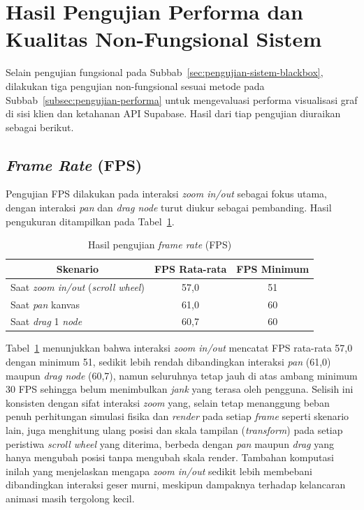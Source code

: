 \section{Hasil Pengujian Performa dan Kualitas Non-Fungsional Sistem}
\label{sec:hasil-pengujian-performa}
\begin{sloppypar}
Selain pengujian fungsional pada Subbab~\ref{sec:pengujian-sistem-blackbox}, dilakukan tiga pengujian non-fungsional sesuai metode pada Subbab~\ref{subsec:pengujian-performa} untuk mengevaluasi performa visualisasi graf di sisi klien dan ketahanan API Supabase. Hasil dari tiap pengujian diuraikan sebagai berikut.
\end{sloppypar}

\subsection{\textit{Frame Rate} (FPS)}
Pengujian FPS dilakukan pada interaksi \textit{zoom in/out} sebagai fokus utama, dengan interaksi \textit{pan} dan \textit{drag node} turut diukur sebagai pembanding. Hasil pengukuran ditampilkan pada Tabel~\ref{tab:fps}.

\begin{table}[H]
\centering
\caption{Hasil pengujian \textit{frame rate} (FPS)}
\label{tab:fps}
\renewcommand{\arraystretch}{1.3}
\begin{tabular}{|l|c|c|}
\hline
\multicolumn{1}{|c|}{\textbf{Skenario}} & \multicolumn{1}{c|}{\textbf{FPS Rata-rata}} & \multicolumn{1}{c|}{\textbf{FPS Minimum}} \\
\hline
Saat \textit{zoom in/out} (\textit{scroll wheel}) & 57,0 & 51 \\
\hline
Saat \textit{pan} kanvas & 61,0 & 60 \\
\hline
Saat \textit{drag} 1 \textit{node} & 60,7 & 60 \\
\hline
\end{tabular}
\end{table}

Tabel~\ref{tab:fps} menunjukkan bahwa interaksi \textit{zoom in/out} mencatat FPS rata-rata 57,0 dengan minimum 51, sedikit lebih rendah dibandingkan interaksi \textit{pan} (61,0) maupun \textit{drag node} (60,7), namun seluruhnya tetap jauh di atas ambang minimum 30 FPS sehingga belum menimbulkan \textit{jank} yang terasa oleh pengguna. Selisih ini konsisten dengan sifat interaksi \textit{zoom} yang, selain tetap menanggung beban penuh perhitungan simulasi fisika dan \textit{render} pada setiap \textit{frame} seperti skenario lain, juga menghitung ulang posisi dan skala tampilan (\textit{transform}) pada setiap peristiwa \textit{scroll wheel} yang diterima, berbeda dengan \textit{pan} maupun \textit{drag} yang hanya mengubah posisi tanpa mengubah skala render. Tambahan komputasi inilah yang menjelaskan mengapa \textit{zoom in/out} sedikit lebih membebani dibandingkan interaksi geser murni, meskipun dampaknya terhadap kelancaran animasi masih tergolong kecil.

